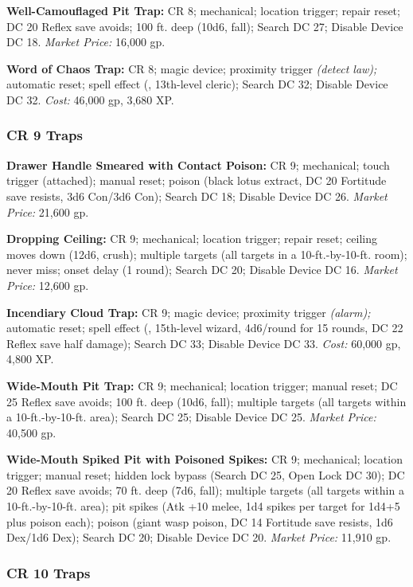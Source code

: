 \textbf{Well-Camouflaged Pit Trap:} CR 8; mechanical; location trigger; repair 
reset; DC 20 Reflex save avoids; 100 ft. deep (10d6, fall); Search DC 27; Disable 
Device DC 18. \textit{Market Price:} 16,000 gp.

\textbf{Word of Chaos Trap:} CR 8; magic device; proximity trigger 
\textit{(detect law); }automatic reset; spell effect (, 13th-level 
cleric); Search DC 32; Disable Device DC 32. \textit{Cost:} 46,000 gp, 3,680 XP.

\subsubsection{CR 9 Traps}

\textbf{Drawer Handle Smeared with Contact Poison:} CR 9; mechanical; touch trigger 
(attached); manual reset; poison (black lotus extract, DC 20 Fortitude save resists, 
3d6 Con/3d6 Con); Search DC 18; Disable Device DC 26. \textit{Market Price:} 21,600 
gp. 

\textbf{Dropping Ceiling:} CR 9; mechanical; location trigger; repair reset; ceiling 
moves down (12d6, crush); multiple targets (all targets in a 10-ft.-by-10-ft. room); 
never miss; onset delay (1 round); Search DC 20; Disable Device DC 16. \textit{Market 
Price:} 12,600 gp. 

\textbf{Incendiary Cloud Trap:} CR 9; magic device; proximity 
trigger \textit{(alarm); }automatic reset; spell effect (, 
15th-level wizard, 4d6/round for 15 rounds, DC 22 Reflex save half damage); Search 
DC 33; Disable Device DC 33. \textit{Cost:} 60,000 gp, 4,800 XP. 

\textbf{Wide-Mouth Pit Trap:} CR 9; mechanical; location trigger; manual reset; 
DC 25 Reflex save avoids; 100 ft. deep (10d6, fall); multiple targets (all targets 
within a 10-ft.-by-10-ft. area); Search DC 25; Disable Device DC 25. \textit{Market 
Price:} 40,500 gp. 

\textbf{Wide-Mouth Spiked Pit with Poisoned Spikes:} CR 9; mechanical; location 
trigger; manual reset; hidden lock bypass (Search DC 25, Open Lock DC 30); DC 
20 Reflex save avoids; 70 ft. deep (7d6, fall); multiple targets (all targets within 
a 10-ft.-by-10-ft. area); pit spikes (Atk +10 melee, 1d4 spikes per target for 
1d4+5 plus poison each); poison (giant wasp poison, DC 14 Fortitude save resists, 
1d6 Dex/1d6 Dex); Search DC 20; Disable Device DC 20. \textit{Market Price:} 11,910 
gp.

\subsubsection{CR 10 Traps}

